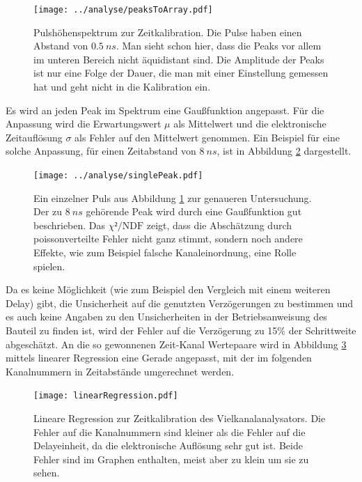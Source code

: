 \documentclass[a4paper,12pt]{article}
\begin{document}
\begin{figure}[h]
	\texttt{[image: ../analyse/peaksToArray.pdf]}
	\caption{Pulshöhenspektrum zur Zeitkalibration. Die Pulse haben einen Abstand von
		$\SI{0.5}{ns}$. Man sieht schon hier, dass die Peaks vor allem im unteren Bereich nicht
	äquidistant sind. Die Amplitude der Peaks ist nur eine Folge der Dauer, die man mit einer Einstellung
gemessen hat und geht nicht in die Kalibration ein.}
	\label{fig:pulsSpektrum}
\end{figure}


Es wird an jeden Peak  im Spektrum eine Gaußfunktion angepasst.
Für die Anpassung wird die Erwartungswert $μ$ als Mittelwert und die elektronische Zeitauflösung $σ$
als Fehler auf den Mittelwert genommen.
Ein Beispiel für eine solche Anpassung, für einen Zeitabstand von $\SI{8}{ns}$, ist in Abbildung \ref{fig:singlePuls} dargestellt.

\begin{figure}[h]
	\texttt{[image: ../analyse/singlePeak.pdf]}
	\caption{Ein einzelner Puls aus Abbildung \ref{fig:pulsSpektrum} zur genaueren Untersuchung. Der zu
	$\SI{8}{ns}$ gehörende Peak wird durch eine Gaußfunktion gut beschrieben. Das $χ²/\text{NDF}$
	zeigt, dass die Abschätzung durch poissonverteilte Fehler nicht ganz stimmt, sondern noch andere
	Effekte, wie zum Beispiel falsche Kanaleinordnung, eine Rolle spielen.}
	\label{fig:singlePuls}
\end{figure}

Da es keine Möglichkeit (wie zum Beispiel den Vergleich mit einem weiteren Delay) gibt, die Unsicherheit auf die genutzten Verzögerungen zu bestimmen und es auch keine Angaben zu
 den Unsicherheiten in der Betriebsanweisung des Bauteil zu finden ist, wird der Fehler auf die
 Verzögerung zu 15\% der Schrittweite abgeschätzt.
 An die so gewonnenen Zeit-Kanal Wertepaare wird in Abbildung \ref{fig:kalibrationsRegression} mittels linearer Regression eine Gerade angepasst, mit der im folgenden
Kanalnummern in Zeitabstände umgerechnet werden.

\begin{figure}
	\texttt{[image: linearRegression.pdf]}
	\caption{Lineare Regression zur Zeitkalibration des Vielkanalanalysators. Die Fehler auf die
	Kanalnummern sind kleiner als die Fehler auf die Delayeinheit, da die elektronische Auflösung sehr gut ist.
	Beide Fehler sind im Graphen enthalten, meist aber zu klein um sie zu sehen.}
	\label{fig:kalibrationsRegression}
\end{figure}
\end{document}
